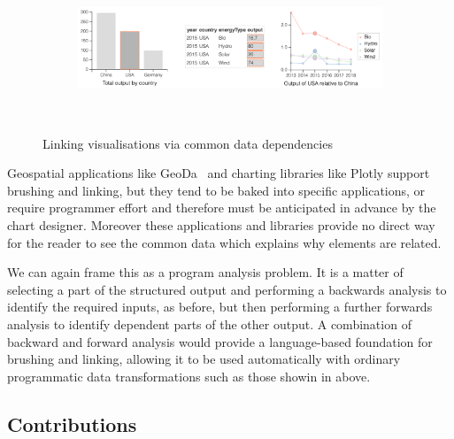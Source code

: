 \begin{figure}[H]
  \begin{subfigure}[b]{0.99\textwidth}
     \centering
     {\includegraphics[scale=0.58]{fig/example/vis-linking.png}}
  \end{subfigure}\\[2mm]
  \begin{subfigure}{0.8\textwidth}
     \small
     
  \end{subfigure}
 \caption{Linking visualisations via common data dependencies}
 \label{fig:introduction:vis-linking}
\end{figure}

Geospatial applications like GeoDa~\cite{anselin06} and charting libraries like Plotly support brushing and linking, but they tend to be baked into specific applications, or require programmer effort and therefore must be anticipated in advance by the chart designer. Moreover these applications and libraries provide no direct way for the reader to see the common data which explains why elements are related.

We can again frame this as a program analysis problem. It is a matter of selecting a part of the structured output and performing a backwards analysis to identify the required inputs, as before, but then performing a further forwards analysis to identify dependent parts of the other output. A combination of backward and forward analysis would provide a language-based foundation for brushing and linking, allowing it to be used automatically with ordinary programmatic data transformations such as those showin in  above.

\subsection{Contributions}

